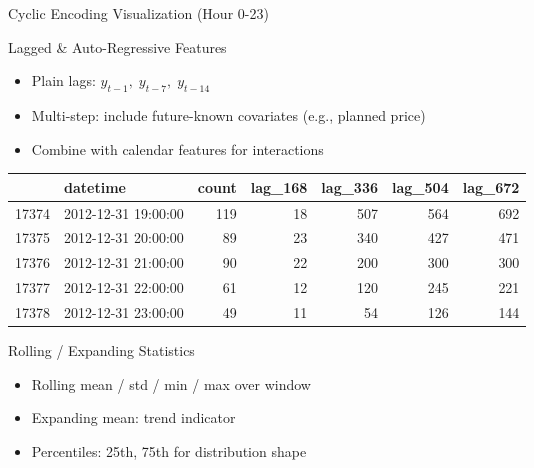 \documentclass[11pt,compress,t,notes=noshow, xcolor=table]{beamer}
\begin{document}
\begin{frame}{Cyclic Encoding Visualization (Hour 0-23)}
  \begin{figure}
    \centering
  \end{figure}
\end{frame}

\begin{vbframe}{Lagged \& Auto-Regressive Features}
  \vfill
  \begin{itemize}
    \item Plain lags: $y_{t-1},\;y_{t-7},\;y_{t-14}$
    \item Multi-step: include future-known covariates (e.g., planned price)
    \item Combine with calendar features for interactions
  \end{itemize}
  \vfill
  \pause
\begin{tabular}{llrrrrr}
\toprule
 & datetime & count & lag\_168 & lag\_336 & lag\_504 & lag\_672 \\
\midrule
17374 & 2012-12-31 19:00:00 & 119 & 18 & 507 & 564 & 692 \\
17375 & 2012-12-31 20:00:00 & 89 & 23 & 340 & 427 & 471 \\
17376 & 2012-12-31 21:00:00 & 90 & 22 & 200 & 300 & 300 \\
17377 & 2012-12-31 22:00:00 & 61 & 12 & 120 & 245 & 221 \\
17378 & 2012-12-31 23:00:00 & 49 & 11 & 54 & 126 & 144 \\
\bottomrule
\end{tabular}
\vfill
\end{vbframe}

\begin{vbframe}{Rolling / Expanding Statistics}
  \vfill
  \begin{itemize}
    \item Rolling mean / std / min / max over window
    \item Expanding mean: trend indicator
    \item Percentiles: 25th, 75th for distribution shape
  \end{itemize}
  \vfill
\end{vbframe}
\end{document}
